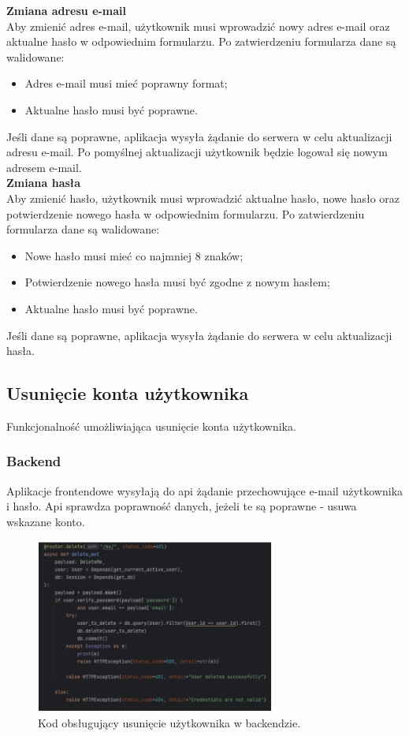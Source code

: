 \textbf{Zmiana adresu e-mail}\\
Aby zmienić adres e-mail, użytkownik musi wprowadzić nowy adres e-mail oraz aktualne hasło w odpowiednim formularzu. Po zatwierdzeniu formularza dane są walidowane:
\begin{itemize}
    \item Adres e-mail musi mieć poprawny format;
    \item Aktualne hasło musi być poprawne.
\end{itemize}
Jeśli dane są poprawne, aplikacja wysyła żądanie do serwera w celu aktualizacji adresu e-mail. Po pomyślnej aktualizacji użytkownik będzie logował się nowym adresem e-mail.\\


\textbf{Zmiana hasła}\\
Aby zmienić hasło, użytkownik musi wprowadzić aktualne hasło, nowe hasło oraz potwierdzenie nowego hasła w odpowiednim formularzu. Po zatwierdzeniu formularza dane są walidowane:
\begin{itemize}
    \item Nowe hasło musi mieć co najmniej 8 znaków;
    \item Potwierdzenie nowego hasła musi być zgodne z nowym hasłem;
    \item Aktualne hasło musi być poprawne.
\end{itemize}
Jeśli dane są poprawne, aplikacja wysyła żądanie do serwera w celu aktualizacji hasła.

\subsection{Usunięcie konta użytkownika}
Funkcjonalność umożliwiająca usunięcie konta użytkownika.

\subsubsection{Backend}
Aplikacje frontendowe wysyłają do api żądanie przechowujące e-mail użytkownika i hasło. Api sprawdza poprawność danych, jeżeli te są poprawne - usuwa wskazane konto.

\begin{figure}[H]
    \centering
    \includegraphics[width=0.7\textwidth]{chapters/chapter_8/screens/delete_user_backend}
    \caption{Kod obsługujący usunięcie użytkownika w backendzie.}
    \label{img:delete_user_backend}
\end{figure}


